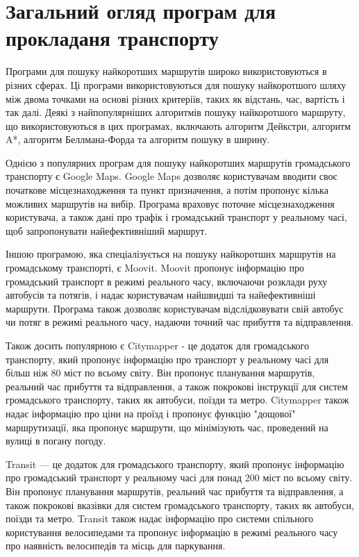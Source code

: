 \section{Загальний огляд програм для прокладаня транспорту}
\label{sec:existing-sulutions}

Програми для пошуку найкоротших маршрутів широко використовуються в різних сферах. Ці програми використовуються для пошуку найкоротшого шляху між двома точками на основі різних критеріїв, таких як відстань, час, вартість і так далі. Деякі з найпопулярніших алгоритмів пошуку найкоротшого маршруту, що використовуються в цих програмах, включають алгоритм Дейкстри, алгоритм A*, алгоритм Беллмана-Форда та алгоритм пошуку в ширину.

Однією з популярних програм для пошуку найкоротших маршрутів громадського транспорту є Google Maps. Google Maps дозволяє користувачам вводити своє початкове місцезнаходження та пункт призначення, а потім пропонує кілька можливих маршрутів на вибір. Програма враховує поточне місцезнаходження користувача, а також дані про трафік і громадський транспорт у реальному часі, щоб запропонувати найефективніший маршрут.

Іншою програмою, яка спеціалізується на пошуку найкоротших маршрутів на громадському транспорті, є Moovit. Moovit пропонує інформацію про громадський транспорт в режимі реального часу, включаючи розклади руху автобусів та потягів, і надає користувачам найшвидші та найефективніші маршрути. Програма також дозволяє користувачам відслідковувати свій автобус чи потяг в режимі реального часу, надаючи точний час прибуття та відправлення.

Також досить популярною є Citymapper - це додаток для громадського транспорту, який пропонує інформацію про транспорт у реальному часі для більш ніж 80 міст по всьому світу. Він пропонує планування маршрутів, реальний час прибуття та відправлення, а також покрокові інструкції для систем громадського транспорту, таких як автобуси, поїзди та метро. Citymapper також надає інформацію про ціни на проїзд і пропонує функцію "дощової" маршрутизації, яка пропонує маршрути, що мінімізують час, проведений на вулиці в погану погоду.

Transit --- це додаток для громадського транспорту, який пропонує інформацію про громадський транспорт у реальному часі для понад 200 міст по всьому світу. Він пропонує планування маршрутів, реальний час прибуття та відправлення, а також покрокові вказівки для систем громадського транспорту, таких як автобуси, поїзди та метро. Transit також надає інформацію про системи спільного користування велосипедами та пропонує інформацію в режимі реального часу про наявність велосипедів та місць для паркування.

